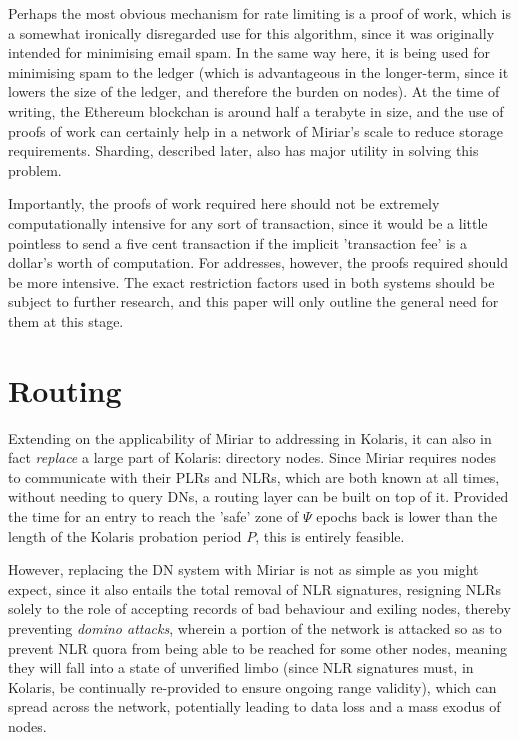 \documentclass{extreport}
\begin{document}
Perhaps the most obvious mechanism for rate limiting is a proof of work, which is a somewhat ironically disregarded use for this algorithm, since it was originally intended for minimising email spam. In the same way here, it is being used for minimising spam to the ledger (which is advantageous in the longer-term, since it lowers the size of the ledger, and therefore the burden on nodes). At the time of writing, the Ethereum blockchan is around half a terabyte in size, and the use of proofs of work can certainly help in a network of Miriar's scale to reduce storage requirements. Sharding, described later, also has major utility in solving this problem.

Importantly, the proofs of work required here should not be extremely computationally intensive for any sort of transaction, since it would be a little pointless to send a five cent transaction if the implicit 'transaction fee' is a dollar's worth of computation. For addresses, however, the proofs required should be more intensive. The exact restriction factors used in both systems should be subject to further research, and this paper will only outline the general need for them at this stage.

\chapter{Routing}
\label{sec:org28e611f}

Extending on the applicability of Miriar to addressing in Kolaris, it can also in fact \emph{replace} a large part of Kolaris: directory nodes. Since Miriar requires nodes to communicate with their PLRs and NLRs, which are both known at all times, without needing to query DNs, a routing layer can be built on top of it. Provided the time for an entry to reach the 'safe' zone of \(\Psi\) epochs back is lower than the length of the Kolaris probation period \(P\), this is entirely feasible.

However, replacing the DN system with Miriar is not as simple as you might expect, since it also entails the total removal of NLR signatures, resigning NLRs solely to the role of accepting records of bad behaviour and exiling nodes, thereby preventing \emph{domino attacks}, wherein a portion of the network is attacked so as to prevent NLR quora from being able to be reached for some other nodes, meaning they will fall into a state of unverified limbo (since NLR signatures must, in Kolaris, be continually re-provided to ensure ongoing range validity), which can spread across the network, potentially leading to data loss and a mass exodus of nodes.
\end{document}
